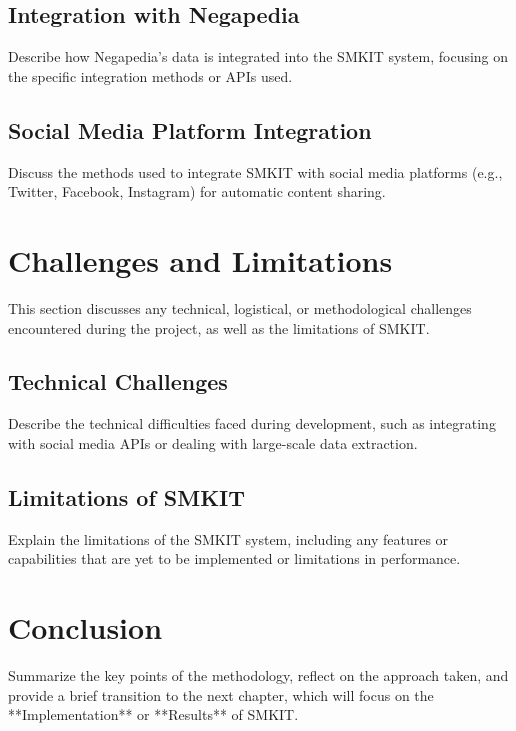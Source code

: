 \subsection{Integration with Negapedia}
\label{subsec:integration_with_negapedia}
Describe how Negapedia’s data is integrated into the SMKIT system, focusing on the specific integration methods or APIs used.

\subsection{Social Media Platform Integration}
\label{subsec:social_media_integration}
Discuss the methods used to integrate SMKIT with social media platforms (e.g., Twitter, Facebook, Instagram) for automatic content sharing.

\section{Challenges and Limitations}
\label{sec:challenges_limitations}
This section discusses any technical, logistical, or methodological challenges encountered during the project, as well as the limitations of SMKIT.

\subsection{Technical Challenges}
\label{subsec:technical_challenges}
Describe the technical difficulties faced during development, such as integrating with social media APIs or dealing with large-scale data extraction.

\subsection{Limitations of SMKIT}
\label{subsec:limitations_of_smkit}
Explain the limitations of the SMKIT system, including any features or capabilities that are yet to be implemented or limitations in performance.

\section{Conclusion}
\label{sec:methodology_conclusion}
Summarize the key points of the methodology, reflect on the approach taken, and provide a brief transition to the next chapter, which will focus on the **Implementation** or **Results** of SMKIT.
